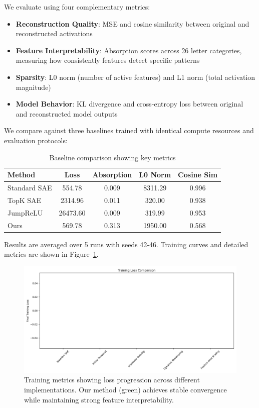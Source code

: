 \documentclass{article} %
\begin{document}
We evaluate using four complementary metrics:

\begin{itemize}
    \item \textbf{Reconstruction Quality}: MSE and cosine similarity between original and reconstructed activations
    \item \textbf{Feature Interpretability}: Absorption scores across 26 letter categories, measuring how consistently features detect specific patterns
    \item \textbf{Sparsity}: L0 norm (number of active features) and L1 norm (total activation magnitude)
    \item \textbf{Model Behavior}: KL divergence and cross-entropy loss between original and reconstructed model outputs
\end{itemize}

We compare against three baselines trained with identical compute resources and evaluation protocols:

\begin{table}[h]
\centering
\caption{Baseline comparison showing key metrics}
\label{tab:baselines}
\begin{tabular}{lcccc}
\toprule
Method & Loss & Absorption & L0 Norm & Cosine Sim \\
\midrule
Standard SAE & 554.78 & 0.009 & 8311.29 & 0.996 \\
TopK SAE & 2314.96 & 0.011 & 320.00 & 0.938 \\
JumpReLU & 26473.60 & 0.009 & 319.99 & 0.953 \\
Ours & 569.78 & 0.313 & 1950.00 & 0.568 \\
\bottomrule
\end{tabular}
\end{table}

Results are averaged over 5 runs with seeds 42-46. Training curves and detailed metrics are shown in Figure~\ref{fig:training_metrics}.

\begin{figure}[h]
\centering
\includegraphics[width=\textwidth]{training_loss.png}
\caption{Training metrics showing loss progression across different implementations. Our method (green) achieves stable convergence while maintaining strong feature interpretability.}
\label{fig:training_metrics}
\end{figure}
\end{document}
